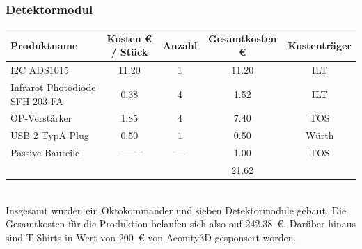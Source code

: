 \subsubsection*{Detektormodul} 
\begin{tabularx}{\textwidth}{L{3.5cm} | S c S c}
	Produktname 					& {Kosten \unit{€} / Stück}	& Anzahl & {Gesamtkosten \unit{€}}	& Kostenträger \\ 
	\hline
	I2C ADS1015						& 11.20  	&   1    & 11.20	& ILT    \\ [2mm]
	Infrarot Photodiode SFH 203 FA	& 0.38		&   4    & 1.52 	& ILT	 \\ [15mm]
	OP-Verstärker    				& 1.85   	&	4    & 7.40 	& TOS    \\ [2mm]
	USB 2 TypA Plug					& 0.50  	&   1    & 0.50 	& Würth  \\ [2mm]
	Passive Bauteile    			& {-------} & {---}	 & 1.00	   	& TOS    \\ [2mm]
	\hline
									&			&		 & 21.62	&		
\end{tabularx} \\

\noindent
Insgesamt wurden ein Oktokommander und sieben Detektormodule gebaut. Die Gesamtkosten für die Produktion belaufen sich also auf \SI{242.38}{€}. Darüber hinaus sind T-Shirts in Wert von \SI{200}{€} von Aconity3D gesponsert worden.